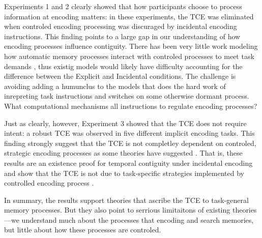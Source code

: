 \documentclass[jou,natbib]{apa6} %
\begin{document}
Experiments 1 and 2 clearly showed that how participants choose to process information at encoding matters: in these experiments, the TCE was eliminated when controled encoding processing was discuraged by incidental encoding instructions. This finding points to a large gap in our understanding of how encoding processes influence contiguity. There has been very little work modeling how automatic memory processes interact with controled processes to meet task demands \citep{LehmMalm13,PolyEtal09}, thus existig models would likely have difficulty accounting for the difference between the Explicit and Incidental conditions. The challenge is avoiding adding a humunclus to the models that does the hard work of inrepreting task instructions and switches on some otherwise dormant process. What computational mechanisms all instructions to regulate encoding processes?

Just as clearly, however, Experiment 3 showed that the TCE does not require intent: a robust TCE was observed in five different implicit encoding tasks. This finding strongly suggest that the TCE is not completley dependent on controled, strategic encoding processes as some theories have suggested \citep{Hint16}. That is, these results are an existence proof for temporal contiguity under incidental encoding and show that the TCE is not due to task-specific strategies implemented by controlled encoding process \citep[cf.][]{Hint16}.

In summary, the results support theories that ascribe the TCE to task-general memory processes. But they also point to serrious limitaitons of existing theories---we understand much about the processes that encoding and search memories, but little about how these processes are controled.





























\end{document}
